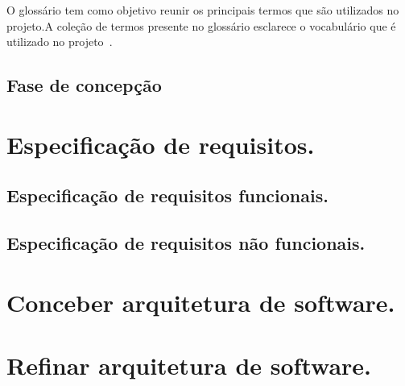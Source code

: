 O glossário tem como objetivo reunir os principais termos que são utilizados no projeto.A coleção de termos presente no glossário esclarece o vocabulário que é utilizado no projeto~\cite{openup}.    

    
\subsection{Fase de concepção}
\section{Especificação de requisitos.}
\subsection{Especificação de requisitos funcionais.}
\subsection{Especificação de requisitos não funcionais.}
\section{Conceber arquitetura de software.}
\section{Refinar arquitetura de software.}
